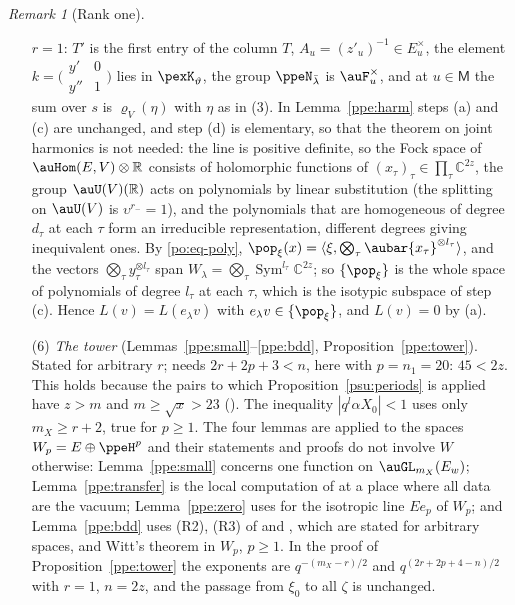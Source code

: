 \documentclass[10pt]{amsart}
\theoremstyle{definition}
\theoremstyle{remark}
\newtheorem{remark}[theorem]{Remark}
\newcommand{\C}{\mathbb C}
\newcommand{\R}{\mathbb R}
\begin{document}
\begin{remark}[Rank one]
\begin{enumerate}
$r=1$: $T'$ is the first entry of the column $T$, $A_u=(z'_u)^{-1}\in E_u^\times$, the element
$k=\bigl(\begin{smallmatrix}y'&0\\y''&1\end{smallmatrix}\bigr)$ lies in $\pexK_\vartheta$, the group
$\ppeN_{\bar\lambda}$ is $\auF_u^\times$, and at $u\in\mathsf M$ the sum over $s$ is
$\varrho_V(\eta)$ with $\eta$ as in (3). In Lemma~\ref{ppe:harm} steps (a) and (c) are unchanged, and
step (d) is elementary, so that the theorem on joint harmonics is not needed: the line is positive
definite, so the Fock space of $\auHom(E,V)\otimes\R$ consists of holomorphic functions of
$(x_\tau)_\tau\in\prod_\tau\C^{2z}$, the group $\auU(V)(\R)$ acts on polynomials by linear substitution
(the splitting on $\auU(V)$ is $\upsilon^{r_-}=1$), and the polynomials that are homogeneous of degree
$d_\tau$ at each $\tau$ form an irreducible representation, different degrees giving inequivalent
ones. By \eqref{po:eq-poly}, $\pop_\xi(x)=\langle\xi,\bigotimes_\tau\aubar{x_\tau}^{\otimes l_\tau}\rangle$,
and the vectors $\bigotimes_\tau y_\tau^{\otimes l_\tau}$ span $W_\lambda=\bigotimes_\tau
\operatorname{Sym}^{l_\tau}\C^{2z}$; so $\{\pop_\xi\}$ is the whole space of polynomials of degree
$l_\tau$ at each $\tau$, which is the isotypic subspace of step (c). Hence $L(v)=L(e_\lambda v)$ with
$e_\lambda v\in\{\pop_\xi\}$, and $L(v)=0$ by (a).
\item[(6)] \emph{The tower} (Lemmas~\ref{ppe:small}--\ref{ppe:bdd}, Proposition~\ref{ppe:tower}). Stated
for arbitrary $r$; needs $2r+2p+3<n$, here with $p=n_1=20$: $45<2z$. This holds because the pairs
to which Proposition~\ref{psu:periods} is applied have $z>m$ and $m\ge\sqrt x>23$
({\cite[Lemma~13.4]{P46}}). The inequality $|q^l\alpha X_0|<1$ uses only $m_X\ge r+2$, true for $p\ge1$.
The four lemmas are applied to the spaces $W_p=E\oplus\ppeH^p$ and their statements and proofs do not
involve $W$ otherwise: Lemma~\ref{ppe:small} concerns one function on $\auGL_{m_X}(E_w)$;
Lemma~\ref{ppe:transfer} is the local computation of {\cite[Lemma~6.8]{P49}} at a place where all data
are the vacuum; Lemma~\ref{ppe:zero} uses {\cite[Lemma~3.62]{P53}} for the isotropic line $Ee_p$ of $W_p$;
and Lemma~\ref{ppe:bdd} uses (R2), (R3) of {\cite[\S3.1.6]{P53}} and {\cite[Lemma~3.32]{P53}}, which are
stated for arbitrary spaces, and Witt's theorem in $W_p$, $p\ge1$. In the proof of
Proposition~\ref{ppe:tower} the exponents are $q^{-(m_X-r)/2}$ and $q^{(2r+2p+4-n)/2}$ with $r=1$,
$n=2z$, and the passage from $\xi_0$ to all $\zeta$ is unchanged.

\end{enumerate}
\end{remark}
\end{document}
